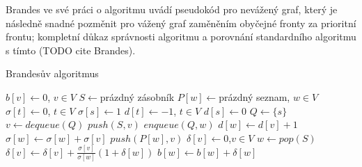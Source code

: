 \documentclass[12pt,titlepage]{report}
\begin{document}

Brandes ve své práci o algoritmu uvádí pseudokód pro nevážený graf, který je
následně snadné pozměnit pro vážený graf zaměněním obyčejné fronty za prioritní
frontu; kompletní důkaz správnosti algoritmu a porovnání standardního algoritmu
s tímto (TODO cite Brandes).



\begin{center}
\begin{minipage}{\textwidth}
\begin{algorithm}[H]
	\caption{Brandesův algoritmus}
		\label{alg:brandes}

	\begin{algorithmic}[1]
	\Statex
	\State $b[v] \gets 0$, $v \in V$
		\State $S \gets $prázdný zásobník
		\State $P[w] \gets $prázdný seznam, $w \in V$
		\State $\sigma[t] \gets 0$, $t \in V$
		\State $\sigma[s] \gets 1$
		\State $d[t] \gets -1$, $t \in V$
		\State $d[s] \gets 0$
		\State $Q \gets \{s\}$
			\State $v \gets dequeue(Q)$
			\State $push(S, v)$
					\State $enqueue(Q, w)$
					\State $d[w] \gets d[v] + 1$
				\EndIf
					\State $\sigma[w] \gets \sigma[w] + \sigma[v]$
					\State $push(P[w], v)$
				\EndIf
			\EndFor
		\EndWhile
		\State $\delta[v] \gets 0$,$v \in V$
		 
			\State $w \gets pop(S)$
				\State $\delta[v] \gets \delta[v] + \frac{\sigma[v]}{\sigma[w]}(1 + \delta[w])$
			\EndFor
				\State $b[w] \gets b[w] + \delta[w]$
			\EndIf
		\EndWhile
	\EndFor
	\end{algorithmic}
\end{algorithm}
\end{minipage}
\end{center}
\mbox{}


\end{document}
